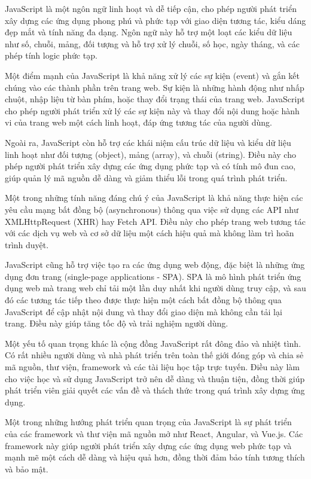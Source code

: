 JavaScript là một ngôn ngữ linh hoạt và dễ tiếp cận, cho phép người phát triển xây dựng các ứng dụng phong phú và phức tạp với giao diện tương tác, kiểu dáng đẹp mắt và tính năng đa dạng. Ngôn ngữ này hỗ trợ một loạt các kiểu dữ liệu như số, chuỗi, mảng, đối tượng và hỗ trợ xử lý chuỗi, số học, ngày tháng, và các phép tính logic phức tạp.

Một điểm mạnh của JavaScript là khả năng xử lý các sự kiện (event) và gắn kết chúng vào các thành phần trên trang web. Sự kiện là những hành động như nhấp chuột, nhập liệu từ bàn phím, hoặc thay đổi trạng thái của trang web. JavaScript cho phép người phát triển xử lý các sự kiện này và thay đổi nội dung hoặc hành vi của trang web một cách linh hoạt, đáp ứng tương tác của người dùng.

Ngoài ra, JavaScript còn hỗ trợ các khái niệm cấu trúc dữ liệu và kiểu dữ liệu linh hoạt như đối tượng (object), mảng (array), và chuỗi (string). Điều này cho phép người phát triển xây dựng các ứng dụng phức tạp và có tính mô đun cao, giúp quản lý mã nguồn dễ dàng và giảm thiểu lỗi trong quá trình phát triển.

Một trong những tính năng đáng chú ý của JavaScript là khả năng thực hiện các yêu cầu mạng bất đồng bộ (asynchronous) thông qua việc sử dụng các API như XMLHttpRequest (XHR) hay Fetch API. Điều này cho phép trang web tương tác với các dịch vụ web và cơ sở dữ liệu một cách hiệu quả mà không làm trì hoãn trình duyệt.

JavaScript cũng hỗ trợ việc tạo ra các ứng dụng web động, đặc biệt là những ứng dụng đơn trang (single-page applications - SPA). SPA là mô hình phát triển ứng dụng web mà trang web chỉ tải một lần duy nhất khi người dùng truy cập, và sau đó các tương tác tiếp theo được thực hiện một cách bất đồng bộ thông qua JavaScript để cập nhật nội dung và thay đổi giao diện mà không cần tải lại trang. Điều này giúp tăng tốc độ và trải nghiệm người dùng.

Một yếu tố quan trọng khác là cộng đồng JavaScript rất đông đảo và nhiệt tình. Có rất nhiều người dùng và nhà phát triển trên toàn thế giới đóng góp và chia sẻ mã nguồn, thư viện, framework và các tài liệu học tập trực tuyến. Điều này làm cho việc học và sử dụng JavaScript trở nên dễ dàng và thuận tiện, đồng thời giúp phát triển viên giải quyết các vấn đề và thách thức trong quá trình xây dựng ứng dụng.

Một trong những hướng phát triển quan trọng của JavaScript là sự phát triển của các framework và thư viện mã nguồn mở như React, Angular, và Vue.js. Các framework này giúp người phát triển xây dựng các ứng dụng web phức tạp và mạnh mẽ một cách dễ dàng và hiệu quả hơn, đồng thời đảm bảo tính tương thích và bảo mật.

